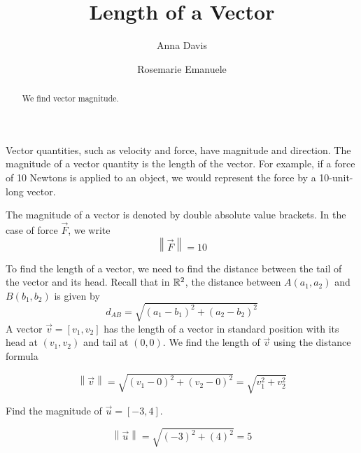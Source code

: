 \documentclass{ximera}
\author{Anna Davis \and Rosemarie Emanuele} \title{Length of a Vector} \license{CC-BY 4.0}
\newcommand\norm[1]{\left\lVert#1\right\rVert}
\begin{document}
\begin{abstract}
 We find vector magnitude.
\end{abstract}
\maketitle
\vskip 5pt


Vector quantities, such as velocity and force, have magnitude and direction.  The magnitude of a vector quantity is the length of the vector.  For example, if a force of 10 Newtons is applied to an object, we would represent the force by a 10-unit-long vector.

 \begin{image}[2in]
\end{image}

The magnitude of a vector is denoted by double absolute value brackets.  In the case of force $\vec{F}$, we write $$\norm{\vec{F}}=10$$

To find the length of a vector, we need to find the distance between the tail of the vector and its head.  Recall that in $\mathbb{R}^2$, the distance between $A(a_1, a_2)$ and $B(b_1, b_2)$ is given by 
\begin{equation*}
d_{AB}=\sqrt{(a_1-b_1)^2+(a_2-b_2)^2}
\end{equation*}
A vector $\vec{v}=[v_1, v_2]$ has the length of  a vector in standard position with its head at $(v_1, v_2)$ and tail at $(0, 0)$. We find the length of $\vec{v}$ using the distance formula

\begin{equation}\label{eq:normr2}
\norm{\vec{v}}=\sqrt{(v_1-0)^2+(v_2-0)^2}=\sqrt{v_1^2+v_2^2}
\end{equation}

\begin{example} Find the magnitude of $\vec{u}=[-3,4]$.  
\begin{image}[1.8in]
\end{image}
\begin{explanation}

 $$
\norm{\vec{u}}=\sqrt{(-3)^2+(4)^2}=5
$$
\end{explanation}
\end{example}
\end{document}
